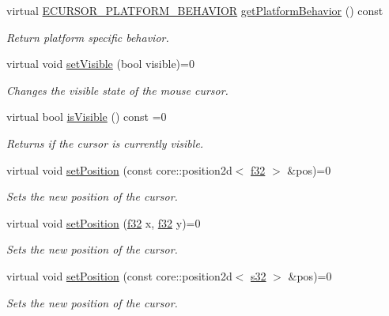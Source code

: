 \begin{DoxyCompactItemize}
virtual \hyperlink{namespaceirr_1_1gui_abbd186f9cfba2f805d98248df226acef}{E\+C\+U\+R\+S\+O\+R\+\_\+\+P\+L\+A\+T\+F\+O\+R\+M\+\_\+\+B\+E\+H\+A\+V\+I\+OR} \hyperlink{classirr_1_1gui_1_1ICursorControl_aad19b5b02de0b8bc476c66b152b745c4}{get\+Platform\+Behavior} () const
\begin{DoxyCompactList}\small\item\em Return platform specific behavior. \end{DoxyCompactList}\item 
virtual void \hyperlink{classirr_1_1gui_1_1ICursorControl_aceb41d68494e2b2076fbc6949b254c74}{set\+Visible} (bool visible)=0
\begin{DoxyCompactList}\small\item\em Changes the visible state of the mouse cursor. \end{DoxyCompactList}\item 
virtual bool \hyperlink{classirr_1_1gui_1_1ICursorControl_ae1d1ca4c1c3042388881fabda4e53a42}{is\+Visible} () const =0
\begin{DoxyCompactList}\small\item\em Returns if the cursor is currently visible. \end{DoxyCompactList}\item 
virtual void \hyperlink{classirr_1_1gui_1_1ICursorControl_a951b5afe97fa21d98ce5360d96314306}{set\+Position} (const core\+::position2d$<$ \hyperlink{namespaceirr_a0277be98d67dc26ff93b1a6a1d086b07}{f32} $>$ \&pos)=0
\begin{DoxyCompactList}\small\item\em Sets the new position of the cursor. \end{DoxyCompactList}\item 
virtual void \hyperlink{classirr_1_1gui_1_1ICursorControl_adca41054684f73435c9b045520f7c83b}{set\+Position} (\hyperlink{namespaceirr_a0277be98d67dc26ff93b1a6a1d086b07}{f32} x, \hyperlink{namespaceirr_a0277be98d67dc26ff93b1a6a1d086b07}{f32} y)=0
\begin{DoxyCompactList}\small\item\em Sets the new position of the cursor. \end{DoxyCompactList}\item 
virtual void \hyperlink{classirr_1_1gui_1_1ICursorControl_a421c770ffc494f8f6082a16bef0feed2}{set\+Position} (const core\+::position2d$<$ \hyperlink{namespaceirr_ac66849b7a6ed16e30ebede579f9b47c6}{s32} $>$ \&pos)=0
\begin{DoxyCompactList}\small\item\em Sets the new position of the cursor. \end{DoxyCompactList}\item 

\end{DoxyCompactItemize}
